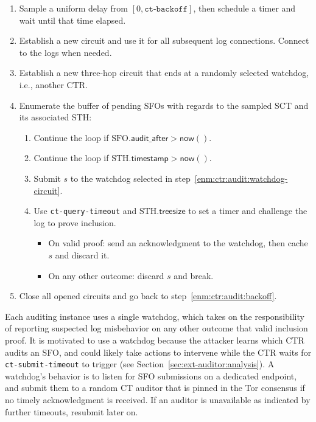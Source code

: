 \begin{enumerate}
	\item\label{enm:ctr:audit:backoff} Sample a uniform delay from
			$[0, \texttt{ct-backoff}]$,
		then schedule a timer and wait until that time elapsed.
	\item\label{enm:ctr:audit:log-circuit} Establish a new circuit and use it
		for all subsequent log connections.  Connect to the logs when needed.
	\item\label{enm:ctr:audit:watchdog-circuit} Establish a new three-hop
		circuit that ends at a randomly selected watchdog, i.e., another CTR.
	\item\label{enm:ctr:audit:loop} Enumerate the buffer of pending SFOs with
		regards to the sampled SCT and its associated STH:
		\begin{enumerate}
			\item\label{enm:ctr:audit:too-soon} Continue the loop if
				$\textrm{SFO}.\mathsf{audit\_after} > \mathsf{now}()$.
			\item\label{enm:ctr:audit:too-soon2} Continue the loop if
				$\textrm{STH}.\mathsf{timestamp} > \mathsf{now}()$.
			\item\label{enm:ctr:audit:watchdog} Submit $s$ to the
				watchdog selected in step~\ref{enm:ctr:audit:watchdog-circuit}.
			\item\label{enm:ctr:audit:challenge} Use \texttt{ct-query-timeout}
				and $\textrm{STH}.\mathsf{treesize}$ to set a timer and
				challenge the log to prove inclusion.
				\begin{itemize}
					\item On valid proof: send an acknowledgment to the
						watchdog, then cache $s$ and discard it.
					\item On any other outcome: discard $s$ and break.
				\end{itemize}
		\end{enumerate}
	\item\label{enm:ctr:audit:teardown} Close all opened circuits and go back to
		step~\ref{enm:ctr:audit:backoff}.
\end{enumerate}

Each auditing instance uses a single watchdog, which takes on the responsibility
of reporting suspected log misbehavior on any other outcome that valid inclusion
proof.  It is motivated to use a watchdog because the attacker learns which
CTR audits an SFO, and could likely take actions to intervene while the CTR
waits for \texttt{ct-submit-timeout} to trigger (see
Section~\ref{sec:ext-auditor:analysis}).  A watchdog's behavior is to listen for
SFO submissions on a dedicated endpoint, and submit them to a random CT auditor
that is pinned in the Tor consensus if no timely acknowledgment is received.  If
an auditor is unavailable as indicated by further timeouts, resubmit later on.

